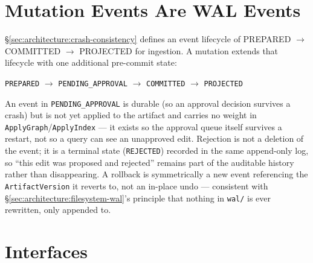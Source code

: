 \section{Mutation Events Are WAL Events}
\label{sec:mutation:eventing}

\S\ref{sec:architecture:crash-consistency} defines an event lifecycle of PREPARED $\to$ COMMITTED $\to$ PROJECTED for ingestion. A mutation extends that lifecycle with one additional pre-commit state:

\begin{center}
\texttt{PREPARED} $\to$ \texttt{PENDING\_APPROVAL} $\to$ \texttt{COMMITTED} $\to$ \texttt{PROJECTED}
\end{center}

An event in \texttt{PENDING\_APPROVAL} is durable (so an approval decision survives a crash) but is not yet applied to the artifact and carries no weight in \texttt{ApplyGraph}/\texttt{ApplyIndex} --- it exists so the approval queue itself survives a restart, not so a query can see an unapproved edit. Rejection is not a deletion of the event; it is a terminal state (\texttt{REJECTED}) recorded in the same append-only log, so ``this edit was proposed and rejected'' remains part of the auditable history rather than disappearing. A rollback is symmetrically a new event referencing the \texttt{ArtifactVersion} it reverts to, not an in-place undo --- consistent with \S\ref{sec:architecture:filesystem-wal}'s principle that nothing in \texttt{wal/} is ever rewritten, only appended to.

\section{Interfaces}
\label{sec:mutation:interfaces}

